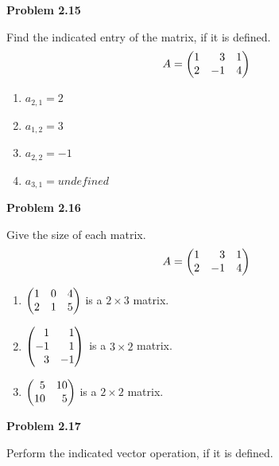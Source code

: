 \documentclass[12pt]{article}
\newenvironment{problem}[1][default]{
  \begin{framed}\begin{minipage}{0.97\textwidth}
  \setlength{\parskip}{4mm}
  {\bf Problem #1}
}{\end{minipage}\end{framed}}
\newcommand\m[2][]{
	\ifthenelse{\equal {#1} {}}
		{\begin{pmatrix*}[r]#2\end{pmatrix*}}
		{\left(\begin{array}{#1}#2\end{array}\right)}
}
\begin{document}
\begin{problem}[2.15]
Find the indicated entry of the matrix, if it is defined.
\[
A = \m{1 &  3 & 1 \\ 2 & -1 & 4}
\]
\end{problem}

\begin{enumerate}[label={\bf(\alph*)}]
	\item $ a_{2,1} = 2 $
	\item $ a_{1,2} = 3 $
	\item $ a_{2,2} = -1 $
	\item $ a_{3,1} = undefined $
\end{enumerate}


\begin{problem}[2.16]
Give the size of each matrix.
\[
A = \m{ 1 &  3 & 1 \\ 2 & -1 & 4 }
\]
\end{problem}

\begin{enumerate}[label=\bf(\alph*)]
	\item $ \m{1 & 0 & 4 \\ 2 & 1 & 5} $ is a $ 2 \times 3 $ matrix.
	\item $ \m{1 & 1 \\ -1 & 1 \\ 3 & -1} $ is a $ 3 \times 2 $ matrix.
	\item $ \m{5 & 10 \\ 10 & 5} $ is a $ 2 \times 2 $ matrix.
\end{enumerate}


\begin{problem}[2.17]
Perform the indicated vector operation, if it is defined.
\end{problem}
\end{document}
